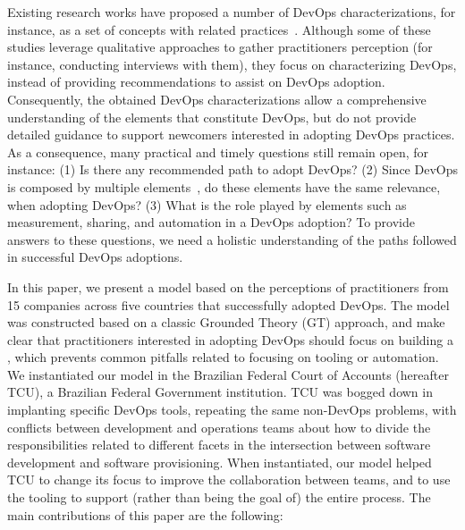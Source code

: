 Existing research works have proposed a
number of DevOps characterizations, for instance, as a set of concepts with
related
practices~\cite{cooperation_dev_ops_esem_2014,devops_a_definition_xp_15,dimensions_of_devops_xp_15,extending_dimensions_icsea_16,characterizing_devops_sbes_2016,qualitative_devops_journalsw_17}. Although some
of these studies leverage qualitative approaches to gather practitioners perception (for instance,
conducting interviews with them), they focus on characterizing DevOps,
instead of providing recommendations to assist on DevOps adoption. Consequently,
the obtained DevOps characterizations allow a comprehensive understanding of
the elements that constitute DevOps, but do not provide detailed guidance to
support newcomers interested in adopting DevOps practices.
As a consequence, many practical and timely questions still remain open, for
instance: (1) Is there any recommended path to adopt DevOps? (2) Since
DevOps is composed by multiple elements~\cite{dimensions_of_devops_xp_15}, do
these elements have the same relevance, when adopting DevOps?
(3) What is the role played by elements such as measurement, sharing, and automation
in a DevOps adoption? To provide answers to these questions, we need a holistic
understanding of the paths followed in successful DevOps adoptions.

In this paper, we present a model based on the perceptions of practitioners from
15 companies across five countries that successfully adopted DevOps. The model
was constructed based on a classic Grounded Theory (GT) approach,
and make clear that practitioners interested in adopting DevOps should focus on building a
\cc, which prevents common pitfalls related to focusing on tooling or automation.
We instantiated our model in the Brazilian Federal Court of
Accounts (hereafter TCU), a Brazilian Federal Government institution. TCU was
bogged down in implanting specific DevOps tools, repeating the same non-DevOps
problems, with conflicts between development and operations teams about how to
divide the responsibilities related to different facets in the intersection
between software development and software provisioning. When instantiated,
our model helped TCU to change its focus to improve the collaboration between teams,
and to use the tooling to support (rather than being the goal of) the entire process.
The main contributions of this paper are the following:


